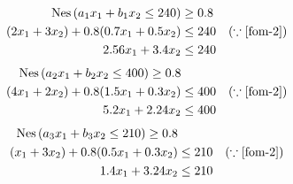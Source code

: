 \documentclass[uplatex, a4j, 11pt, fleqn, dvipdfmx]{article}
\begin{document}
\begin{align}
	\mathrm{Nes} \left( a_1 x_1 + b_1 x_2 \leq 240 \right) & \geq 0.8
	\nonumber                                                                                      \\
	(2 x_1 + 3 x_2) + 0.8 (0.7 x_1 + 0.5 x_2)              & \leq 240
	                                                       & \left( \because \eqref{fom-2} \right)
	\nonumber                                                                                      \\
	2.56 x_1 + 3.4 x_2                                     & \leq 240
	\label{fom-3}
\end{align}
\begin{align}
	\mathrm{Nes} \left( a_2 x_1 + b_2 x_2 \leq 400 \right) \geq 0.8
	\nonumber                                                                         \\
	(4 x_1 + 2 x_2) + 0.8 (1.5 x_1 + 0.3 x_2) & \leq 400
	                                          & \left( \because \eqref{fom-2} \right)
	\nonumber                                                                         \\
	5.2 x_1 + 2.24 x_2                        & \leq 400
	\label{fom-4}
\end{align}
\begin{align}
	\mathrm{Nes} \left( a_3 x_1 + b_3 x_2 \leq 210 \right) \geq 0.8
	\nonumber                                                                       \\
	(x_1 + 3 x_2) + 0.8 (0.5 x_1 + 0.3 x_2) & \leq 210
	                                        & \left( \because \eqref{fom-2} \right)
	\nonumber                                                                       \\
	1.4 x_1 + 3.24 x_2                      & \leq 210
	\label{fom-5}
\end{align}
\end{document}
